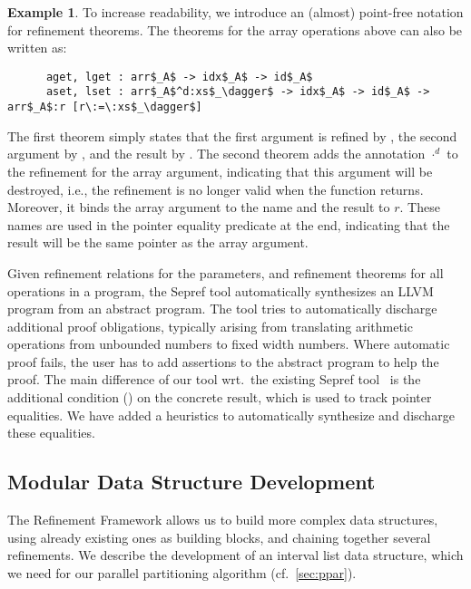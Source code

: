 \documentclass[sn-mathphys,Numbered]{sn-jnl}
\theoremstyle{thmstyleone}%
\theoremstyle{definition}%
\newtheorem{example}{Example}%
\theoremstyle{thmstylethree}%
\begin{document}
\begin{example}
    To increase readability, we introduce an (almost) point-free notation for refinement theorems.
    The theorems for the array operations above can also be written as:
    \begin{lstlisting}
      aget, lget : arr$_A$ -> idx$_A$ -> id$_A$
      aset, lset : arr$_A$^d:xs$_\dagger$ -> idx$_A$ -> id$_A$ -> arr$_A$:r [r\:=\:xs$_\dagger$]
    \end{lstlisting}
    The first theorem simply states that the first argument is refined by ,
    the second argument by , and the result by .
    The second theorem adds the annotation $\cdot^d$ to the refinement for the array argument,
    indicating that this argument will be destroyed, i.e., the refinement is no longer valid when the function returns.
    Moreover, it binds the array argument to the name  and the result to $r$. These names are used in the pointer equality predicate \is{[r\:=\:xs$_\dagger$]}
    at the end, indicating that the result will be the same pointer as the array argument.




  \end{example}

  Given refinement relations for the parameters, and refinement theorems for all operations in a program,
  the Sepref tool automatically synthesizes an LLVM program from an abstract  program.
  The tool tries to automatically discharge additional proof obligations, typically arising from
  translating arithmetic operations from unbounded numbers to fixed width numbers. Where automatic proof fails,
  the user has to add assertions to the abstract program to help the proof.
  The main difference of our tool wrt.\ the existing Sepref tool~\cite{La19-llvm} is the additional
  condition () on the concrete result, which is used to track pointer equalities.
  We have added a heuristics to automatically synthesize and discharge these equalities.

  \subsection{Modular Data Structure Development}\label{sec:mod_ds}
  The Refinement Framework allows us to build more complex data structures, using already existing ones as building blocks,
  and chaining together several refinements.
  We describe the development of an interval list data structure, which we need for our parallel partitioning algorithm (cf.~\ref{sec:ppar}).
\end{document}
